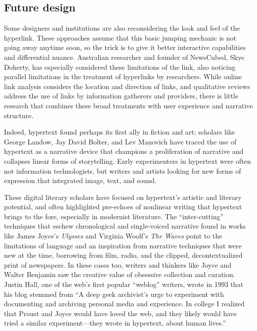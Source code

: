 \subsection{Future design}

Some designers and institutions are also reconsidering the look and feel of the hyperlink. These approaches assume that this basic jumping mechanic is not going away anytime soon, so the trick is to give it better interactive capabilities and differential nuance. Australian researcher and founder of NewsCubed, Skye Doherty, has especially considered these limitations of the link, also noticing parallel limitations in the treatment of hyperlinks by researchers. While online link analysis considers the location and direction of links, and qualitative reviews address the use of links by information gatherers and providers, there is little research that combines these broad treatments with user experience and narrative structure.

Indeed, hypertext found perhaps its first ally in fiction and art; scholars like George Landow, Jay David Bolter, and Lev Manovich have traced the use of hypertext as a narrative device that champions a proliferation of narrative and collapses linear forms of storytelling. Early experimenters in hypertext were often not information technologists, but writers and artists looking for new forms of expression that integrated image, text, and sound.

These digital literary scholars have focused on hypertext's artistic and literary potential, and often highlighted pre-echoes of nonlinear writing that hypertext brings to the fore, especially in modernist literature. The ``inter-cutting'' techniques that eschew chronological and single-voiced narrative found in works like James Joyce's \emph{Ulysses} and Virginia Woolf's \emph{The Waves} point to the limitations of language and an inspiration from narrative techniques that were new at the time, borrowing from film, radio, and the clipped, decontextualized print of newspapers. In these cases too, writers and thinkers like Joyce and Walter Benjamin saw the creative value of obsessive collection and curation. Justin Hall, one of the web's first popular ``weblog'' writers, wrote in 1993 that his blog stemmed from ``A deep geek archivist's urge to experiment with documenting and archiving personal media and experience. In college I realized that Proust and Joyce would have loved the web, and they likely would have tried a similar experiment---they wrote in hypertext, about human lives.''\autocite{gillmor_we_2006}

